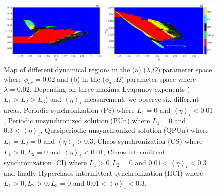 \documentclass[aps,pre,reprint,groupedaddress]{revtex4-1}
\begin{document}
\begin{figure}
	\includegraphics[scale=0.25]{Fig03}%
	\caption{Map of different dynamical regions in the (a) ($\lambda$,$\Omega$) parameter space where $\phi_{ac} = 0.02$ and (b) in the ($\phi_{ac}$,$\Omega$) parameter space where $\lambda = 0.02$. Depending on three maxima Lyapunov exponents ($L_{1}>L_{2}>L_{3}$) and $\left\langle \eta\right\rangle _{t}$ measurement, we observe six different areas. 
	Periodic synchronization (PS) where $L_{1}=0$ and $\left\langle \eta\right\rangle _{t} < 0.01$, Periodic unsynchronized solution (PUn)  where $L_{1}=0$ and $0.3<\left\langle \eta\right\rangle _{t}$, 
	Quasiperiodic unsynchronized solution (QPUn) where $L_{1}=L_{2}=0$ and $\left\langle \eta\right\rangle _{t} > 0.3$, 
	Chaos synchronization (CS) where $L_{1}>0,L_{2}=0$ and $\left\langle \eta\right\rangle _{t} < 0.01$, 
	Chaos intermittent synchronization (CI)  where $L_{1}>0,L_{2}=0$ and $0.01<\left\langle \eta\right\rangle _{t} < 0.3$ and finally 
	Hyperchaos intermittent synchronization (HCI)  where $L_{1}>0,L_{2}>0,L_{3}=0$ and $0.01<\left\langle \eta\right\rangle _{t} < 0.3$.} \label{fig03}
\end{figure}
\end{document}
